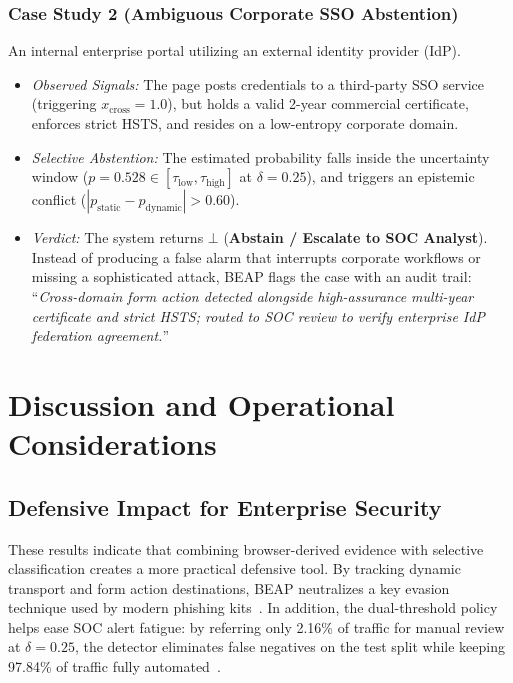 \documentclass[conference]{IEEEtran}
\begin{document}
\subsubsection{Case Study 2 (Ambiguous Corporate SSO Abstention)} An internal enterprise portal utilizing an external identity provider (IdP).
\begin{itemize}[leftmargin=1.5em]
    \item \textit{Observed Signals:} The page posts credentials to a third-party SSO service (triggering $x_{\text{cross}} = 1.0$), but holds a valid 2-year commercial certificate, enforces strict HSTS, and resides on a low-entropy corporate domain.
    \item \textit{Selective Abstention:} The estimated probability falls inside the uncertainty window ($p = 0.528 \in [\tau_{\text{low}}, \tau_{\text{high}}]$ at $\delta = 0.25$), and triggers an epistemic conflict ($|p_{\text{static}} - p_{\text{dynamic}}| > 0.60$).
    \item \textit{Verdict:} The system returns $\bot$ (\textbf{Abstain / Escalate to SOC Analyst}). Instead of producing a false alarm that interrupts corporate workflows or missing a sophisticated attack, BEAP flags the case with an audit trail: ``\textit{Cross-domain form action detected alongside high-assurance multi-year certificate and strict HSTS; routed to SOC review to verify enterprise IdP federation agreement.}''
\end{itemize}

\section{Discussion and Operational Considerations}\label{discussion}

\subsection{Defensive Impact for Enterprise Security}\label{defensive-impact}

These results indicate that combining browser-derived evidence with selective classification creates a more practical defensive tool. By tracking dynamic transport and form action destinations, BEAP neutralizes a key evasion technique used by modern phishing kits~\cite{castano2023}. In addition, the dual-threshold policy helps ease SOC alert fatigue: by referring only 2.16\% of traffic for manual review at $\delta = 0.25$, the detector eliminates false negatives on the test split while keeping 97.84\% of traffic fully automated~\cite{calzarossa2025,bezerra2025}.
\end{document}
